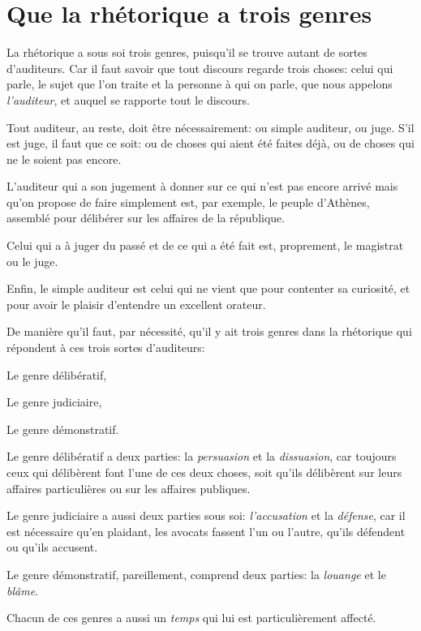 
\section{Que la rhétorique a trois genres}

La rhétorique a sous soi trois genres, puisqu'il se trouve autant de sortes d'auditeurs. Car il faut savoir que
tout discours regarde trois choses: celui qui parle, le sujet que l'on traite et la personne à qui on parle, que
nous appelons \emph{l'auditeur}, et auquel se rapporte tout le discours. 

Tout auditeur, au reste, doit être nécessairement: ou simple auditeur, ou juge. S'il est juge, il faut que ce soit:
ou de choses qui aient été faites déjà, ou de choses qui ne le soient pas encore.

L'auditeur qui a son jugement à donner sur ce qui n'est pas encore arrivé mais qu'on propose de faire simplement
est, par exemple, le peuple d'Athènes, assemblé pour délibérer sur les affaires de la république.

Celui qui a à juger du passé et de ce qui a été fait est, proprement, le magistrat ou le juge.

Enfin, le simple auditeur est celui qui ne vient que pour contenter sa curiosité, et pour avoir le plaisir d'entendre
un excellent orateur.

De manière qu'il faut, par nécessité, qu'il y ait trois genres dans la rhétorique qui répondent à ces trois sortes
d'auditeurs:

\begin{emphpar}
Le genre délibératif,

Le genre judiciaire,

Le genre démonstratif.
\end{emphpar}

Le genre délibératif a deux parties: la \emph{persuasion} et la \emph{dissuasion}, car toujours ceux qui délibèrent font
l'une de ces deux choses, soit qu'ils délibèrent sur leurs affaires particulières ou sur les affaires publiques.

Le genre judiciaire a aussi deux parties sous soi: \emph{l'accusation} et la \emph{défense}, car il est nécessaire qu'en
plaidant, les avocats fassent l'un ou l'autre, qu'ils défendent ou qu'ils accusent.

Le genre démonstratif, pareillement, comprend deux parties: la \emph{louange} et le \emph{blâme}.

\bigbreak

Chacun de ces genres a aussi un \emph{temps} qui lui est particulièrement affecté.

